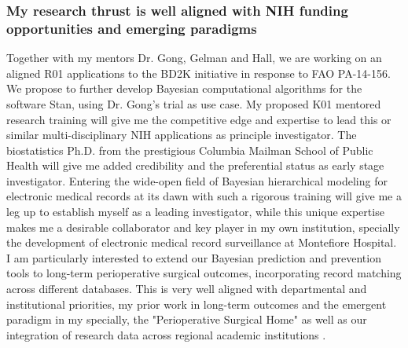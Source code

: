 \documentclass[11pt,notitlepage]{article}
\begin{document}
\subsubsection*{My research thrust is well aligned with NIH funding opportunities and emerging paradigms}
Together with my mentors Dr. Gong, Gelman and Hall, we are working on an aligned R01 applications to the BD2K initiative in response to FAO PA-14-156. We propose to further develop Bayesian computational algorithms for the software Stan, using Dr. Gong's trial as use case. My proposed K01 mentored research training will give me the competitive edge and expertise to lead this or similar multi-disciplinary NIH applications as principle investigator. The biostatistics Ph.D. from the prestigious Columbia Mailman School of Public Health will give me added credibility and the preferential status as early stage investigator. Entering the wide-open field of Bayesian hierarchical modeling for electronic medical records at its dawn with such a rigorous training will give me a leg up to establish myself as a leading investigator, while this unique expertise makes me a desirable collaborator and key player in my own institution, specially the development of electronic medical record surveillance at Montefiore Hospital. I am particularly interested to extend our Bayesian prediction and prevention tools to long-term perioperative surgical outcomes, incorporating record matching across different databases. This is very well aligned with departmental and institutional priorities, my prior work in long-term outcomes \cite{Andreae_23811426} and the emergent paradigm in my specially, the "Perioperative Surgical Home" \cite{Vetter_24781579} as well as our integration of research data across regional academic institutions \cite{Kaushal_24821739}.



\newpage


\end{document}
